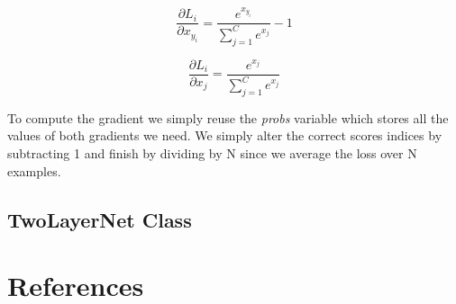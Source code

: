 \documentclass[12pt]{article}
\begin{document}
\begin{equation}
    \frac{\partial L_{i}}{\partial x_{y_i}} = \frac{e^{x_{y_i}}}
    {\sum_{j=1}^C e^{x_{j}}} - 1
\end{equation}

\begin{equation}
    \frac{\partial L_{i}}{\partial x_j} = \frac{e^{x_{j}}}
    {\sum_{j=1}^C e^{x_j}}
\end{equation}

To compute the gradient we simply reuse the \emph{probs} variable which stores
all the values of both gradients we need. We simply alter the correct scores
indices by subtracting 1 and finish by dividing by N since we average the loss 
over N examples. 

\subsection{TwoLayerNet Class}

\section{References}
\end{document}
